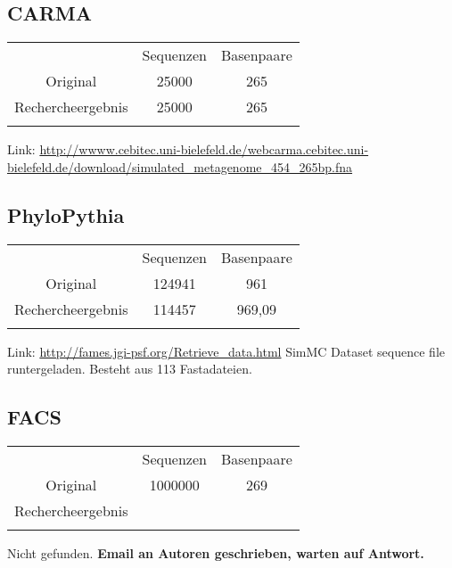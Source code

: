 \documentclass[a4paper, 11pt]{scrartcl}
\begin{document}
\begin{flushleft}
\subsection{CARMA}
\begin{tabular}{ccc}
& Sequenzen & Basenpaare \\
Original&25000&265\\
Rechercheergebnis&25000&265\\
&&\\
\end{tabular}
\linebreak
\color{red}
Link: \url{http://wwww.cebitec.uni-bielefeld.de/webcarma.cebitec.uni-bielefeld.de/download/simulated_metagenome_454_265bp.fna}
\color{black}

\subsection{PhyloPythia}
\begin{tabular}{ccc}
& Sequenzen & Basenpaare \\
Original&124941&961\\
Rechercheergebnis&114457&969,09\\
&&\\
\end{tabular}
\linebreak
\color{red}
Link: \url{http://fames.jgi-psf.org/Retrieve_data.html}
\linebreak
SimMC Dataset sequence file runtergeladen.
\linebreak
Besteht aus 113 Fastadateien.
\color{black}

\subsection{FACS}
\begin{tabular}{ccc}
& Sequenzen & Basenpaare \\
Original&1000000&269\\
Rechercheergebnis&&\\
&&\\
\end{tabular}
\linebreak
\color{red}
\linebreak
Nicht gefunden. 
\linebreak
\linebreak
\textbf{Email an Autoren geschrieben, warten auf Antwort.}
\newpage


\end{flushleft}
\end{document}
